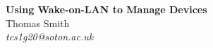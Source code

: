 \documentclass[11pt]{article}
\begin{document}
\begin{center}
  \Large
  \textbf{Using Wake-on-LAN to Manage Devices}\\
  \vspace{2mm}
  \normalsize
  Thomas Smith\\
  \textit{tcs1g20@soton.ac.uk}
\end{center}

\vspace{5mm}

\begin{multicols*}{2}

  
  
  
  

  \printbibliography
\end{multicols*}
\end{document}
